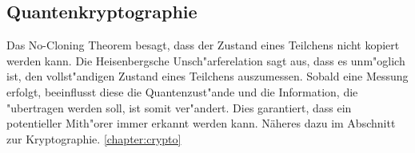 \begin{refsection}
\subsection{Quantenkryptographie} 
Das No-Cloning Theorem besagt, dass der Zustand eines Teilchens nicht kopiert werden kann. Die Heisenbergsche Unsch"arferelation sagt aus, dass es unm"oglich ist, den vollst"andigen Zustand eines Teilchens auszumessen. Sobald eine Messung erfolgt, beeinflusst diese die Quantenzust"ande und die Information, die "ubertragen werden soll, ist somit ver"andert. Dies garantiert, dass ein potentieller Mith"orer immer erkannt werden kann. Näheres dazu im Abschnitt zur Kryptographie. \ref{chapter:crypto}

\printbibliography[heading=subbibliography]
\end{refsection}